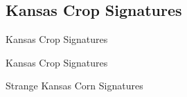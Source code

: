 \documentclass[  compress,xcolor={usenames,dvipsnames}]{beamer}
\begin{document}
\subsection{Kansas Crop Signatures}
\begin{frame}{Kansas Crop Signatures}
\end{frame}

\begin{frame}{Kansas Crop Signatures}
\begin{figure}
  \centering
  \resizebox{0.65\textwidth}{!}{}
\end{figure}
\end{frame}

\begin{frame}{Strange Kansas Corn Signatures}
\begin{figure}
  \centering
  \resizebox{0.7\textwidth}{!}{}
\end{figure}
\end{frame}
\end{document}
